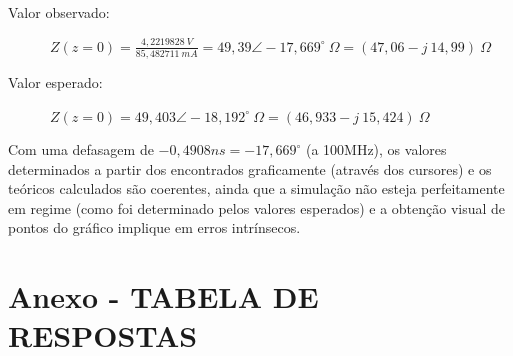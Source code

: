 \documentclass[12pt,a4paper]{article}
\begin{document}
Valor observado:

\ \ \ \ \ \ $Z(z=0) =\frac{4,2219828\ V}{85,482711\ mA}= 49,39\angle -17,669^\circ \ \Omega=(47,06-j\ 14,99) \ \Omega$

Valor esperado:

\ \ \ \ \ \ $Z(z=0)= 49,403\angle -18,192^\circ \ \Omega= (46,933 - j\ 15,424) \ \Omega$

Com uma defasagem de $-0,4908 ns = -17,669^\circ$ (a 100MHz), os valores determinados a partir dos encontrados graficamente (através dos cursores) e os teóricos calculados são coerentes, ainda que a simulação não esteja perfeitamente em regime (como foi determinado pelos valores esperados) e a obtenção visual de pontos do gráfico implique em erros intrínsecos.



\newpage

\section*{Anexo - TABELA DE RESPOSTAS}

\vspace{4.5cm}
\end{document}
